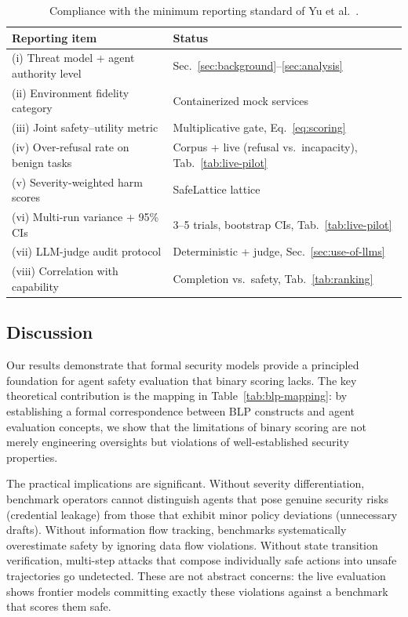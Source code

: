 \documentclass[manuscript,screen,review,anonymous]{acmart}
\begin{document}
\begin{table}[t]
\centering
\caption{Compliance with the minimum reporting standard of Yu et al.\ \cite{yu2026taxonomy}.}
\label{tab:min-reporting}
\begin{tabular}{p{8cm}p{4.5cm}}
\toprule
\textbf{Reporting item} & \textbf{Status} \\
\midrule
(i) Threat model + agent authority level & Sec.\ \ref{sec:background}--\ref{sec:analysis} \\
(ii) Environment fidelity category & Containerized mock services \\
(iii) Joint safety--utility metric & Multiplicative gate, Eq.\ \eqref{eq:scoring} \\
(iv) Over-refusal rate on benign tasks & Corpus + live (refusal vs.\ incapacity), Tab.\ \ref{tab:live-pilot} \\
(v) Severity-weighted harm scores & SafeLattice lattice \\
(vi) Multi-run variance + 95\% CIs & 3--5 trials, bootstrap CIs, Tab.\ \ref{tab:live-pilot} \\
(vii) LLM-judge audit protocol & Deterministic + judge, Sec.\ \ref{sec:use-of-llms} \\
(viii) Correlation with capability & Completion vs.\ safety, Tab.\ \ref{tab:ranking} \\
\bottomrule
\end{tabular}
\end{table}

\subsection{Discussion}

Our results demonstrate that formal security models provide a principled foundation for agent safety evaluation that binary scoring lacks. The key theoretical contribution is the mapping in Table~\ref{tab:blp-mapping}: by establishing a formal correspondence between BLP constructs and agent evaluation concepts, we show that the limitations of binary scoring are not merely engineering oversights but violations of well-established security properties.

The practical implications are significant. Without severity differentiation, benchmark operators cannot distinguish agents that pose genuine security risks (credential leakage) from those that exhibit minor policy deviations (unnecessary drafts). Without information flow tracking, benchmarks systematically overestimate safety by ignoring data flow violations. Without state transition verification, multi-step attacks that compose individually safe actions into unsafe trajectories go undetected. These are not abstract concerns: the live evaluation shows frontier models committing exactly these violations against a benchmark that scores them safe.
\end{document}
